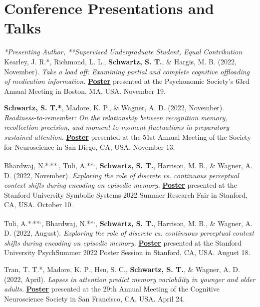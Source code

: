 \section*{Conference Presentations and Talks}
\textit{*Presenting Author, **Supervised Undergraduate Student, \dag{} Equal Contribution}\\

Kearley, J. R.*, Richmond, L. L., \textbf{Schwartz, S. T.}, \& Hargis, M. B. (2022, November). \textit{Take a load off: Examining partial and complete cognitive offloading of medication information.} \textbf{\underline{Poster}} presented at the Psychonomic Society's 63rd Annual Meeting in Boston, MA, USA. November 19.

\pubspace

\textbf{Schwartz, S. T.*}, Madore, K. P., \& Wagner, A. D. (2022, November). \textit{Readiness-to-remember: On the relationship between recognition memory, recollection precision, and moment-to-moment fluctuations in preparatory sustained attention.} \textbf{\underline{Poster}} presented at the 51st Annual Meeting of the Society for Neuroscience in San Diego, CA, USA. November 13.

\pubspace

Bhardwaj, N.*\textsuperscript{,}**\textsuperscript{,}\dag, Tuli, A.**\textsuperscript{,}\dag, \textbf{Schwartz, S. T.}, Harrison, M. B., \& Wagner, A. D. (2022, November). \textit{Exploring the role of discrete vs. continuous perceptual context shifts during encoding on episodic memory.} \textbf{\underline{Poster}} presented at the Stanford University Symbolic Systems 2022 Summer Research Fair in Stanford, CA, USA. October 10.

\pubspace

Tuli, A.*\textsuperscript{,}**\textsuperscript{,}\dag, Bhardwaj, N.**\textsuperscript{,}\dag, \textbf{Schwartz, S. T.}, Harrison, M. B., \& Wagner, A. D. (2022, August). \textit{Exploring the role of discrete vs. continuous perceptual context shifts during encoding on episodic memory.} \textbf{\underline{Poster}} presented at the Stanford University PsychSummer 2022 Poster Session in Stanford, CA, USA. August 18.

\pubspace

Tran, T. T.*, Madore, K. P., Hsu, S. C., \textbf{Schwartz, S. T.}, \& Wagner, A. D. (2022, April). \textit{Lapses in attention predict memory variability in younger and older adults.} \textbf{\underline{Poster}} presented at the 29th Annual Meeting of the Cognitive Neuroscience Society in San Francisco, CA, USA. April 24.

